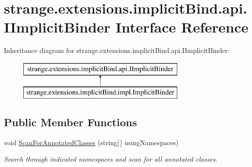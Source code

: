 \hypertarget{interfacestrange_1_1extensions_1_1implicit_bind_1_1api_1_1_i_implicit_binder}{\section{strange.\-extensions.\-implicit\-Bind.\-api.\-I\-Implicit\-Binder Interface Reference}
\label{interfacestrange_1_1extensions_1_1implicit_bind_1_1api_1_1_i_implicit_binder}
}
Inheritance diagram for strange.\-extensions.\-implicit\-Bind.\-api.\-I\-Implicit\-Binder\-:\begin{figure}[H]
\begin{center}
\leavevmode
\includegraphics[height=2.000000cm]{interfacestrange_1_1extensions_1_1implicit_bind_1_1api_1_1_i_implicit_binder}
\end{center}
\end{figure}
\subsection*{Public Member Functions}
\begin{DoxyCompactItemize}
\item 
void \hyperlink{interfacestrange_1_1extensions_1_1implicit_bind_1_1api_1_1_i_implicit_binder_a6329cede9039c5848601f022bd974ad9}{Scan\-For\-Annotated\-Classes} (string\mbox{[}$\,$\mbox{]} using\-Namespaces)
\begin{DoxyCompactList}\small\item\em Search through indicated namespaces and scan for all annotated classes. \end{DoxyCompactList}\end{DoxyCompactItemize}


